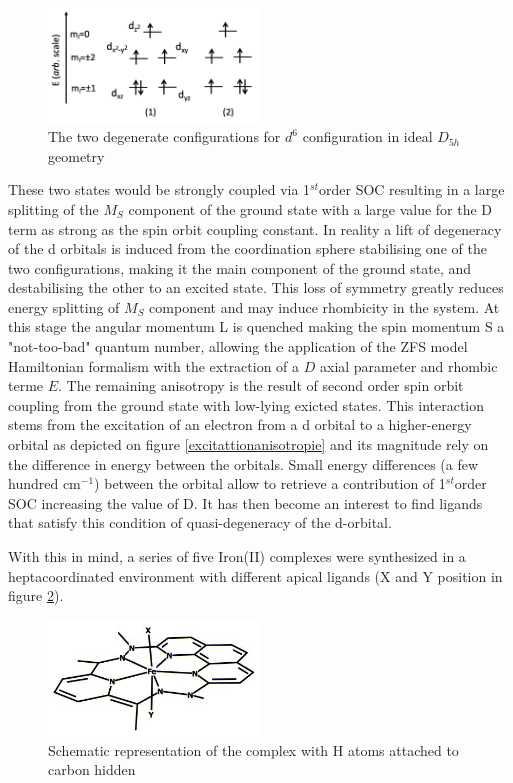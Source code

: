 \documentclass[10pt]{report}
\numberwithin{equation}{section}
\begin{document}
\begin{figure}[h!]
    \centering
    \includegraphics[width=0.5\textwidth]{Images/DiagOrbFed6.png}
    \caption{The two degenerate configurations for $d^6$ configuration in ideal $D_{5h}$ geometry}
    \label{Fer_config}
\end{figure}

These two states would be strongly coupled via 1$^{st}$order SOC resulting in a large splitting of the $M_S$ component of the ground state with a large value for the D term as strong as the spin orbit coupling constant.
In reality a lift of degeneracy of the d orbitals is induced from the coordination sphere stabilising one of the two configurations, making it the main component of the ground state, and destabilising the other to an excited state.
This loss of symmetry greatly reduces energy splitting of $M_S$ component and may induce rhombicity in the system. 
At this stage the angular momentum L is quenched making the spin momentum S a "not-too-bad" quantum number, allowing the application of the ZFS model Hamiltonian formalism with the extraction of a $D$ axial parameter and rhombic terme $E$.
The remaining anisotropy is the result of second order spin orbit coupling from the ground state with low-lying exicted states.
This interaction stems from the excitation of an electron from a d orbital to a higher-energy orbital as depicted on figure \ref{excitattionanisotropie} and its magnitude rely on the difference in energy between the orbitals.
Small energy differences (a few hundred cm$^{-1}$) between the orbital allow to retrieve a contribution of 1$^{st}$order SOC increasing the value of D.
It has then become an interest to find ligands that satisfy this condition of quasi-degeneracy of the d-orbital.

With this in mind, a series of five Iron(II) complexes were synthesized in a heptacoordinated environment with different apical ligands (X and Y position in figure \ref{FeComplex}).

\begin{figure}[h!]
    \centering
    \includegraphics[width=0.5\textwidth]{Images/ComplexFe.XY.jpg}
    \caption{Schematic representation of the complex with H atoms attached to carbon hidden}
    \label{FeComplex}
\end{figure}
\end{document}
